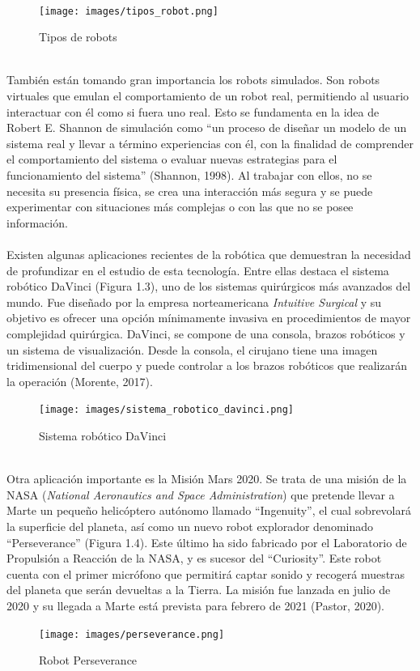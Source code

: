 \documentclass{report}
\begin{document}
\\
\begin{figure}
  \centering
    \texttt{[image: images/tipos\_robot.png]}
  \caption{Tipos de robots}
  \label{Tipos de robots}
\end{figure}
\\
También están tomando gran importancia los robots simulados. Son robots virtuales que emulan el comportamiento de un robot real, permitiendo al usuario interactuar con él como si fuera uno real. Esto se fundamenta en la idea de Robert E. Shannon de simulación como “un proceso de diseñar un modelo de un sistema real y llevar a término experiencias con él, con la finalidad de comprender el comportamiento del sistema o evaluar nuevas estrategias para el funcionamiento del sistema” (Shannon, 1998). Al trabajar con ellos, no se necesita su presencia física, se crea una interacción más segura y se puede experimentar con situaciones más complejas o con las que no se posee información.
\\
\\
Existen algunas aplicaciones recientes de la robótica que demuestran la necesidad de profundizar en el estudio de esta tecnología. Entre ellas destaca el sistema robótico DaVinci (Figura 1.3), uno de los sistemas quirúrgicos más avanzados del mundo. Fue diseñado por la empresa norteamericana \textit{Intuitive Surgical} y su objetivo es ofrecer una opción mínimamente invasiva en procedimientos de mayor complejidad quirúrgica. DaVinci, se compone de una consola, brazos robóticos y un sistema de visualización. Desde la consola, el cirujano tiene una imagen tridimensional del cuerpo y puede controlar a los brazos robóticos que realizarán la operación (Morente, 2017).
\\
\begin{figure} [h!]
  \centering
    \texttt{[image: images/sistema\_robotico\_davinci.png]}
  \caption{Sistema robótico DaVinci}
  \label{Sistema robótico DaVinci}
\end{figure}
\\
Otra aplicación importante es la Misión Mars 2020. Se trata de una misión de la NASA (\textit{National Aeronautics and Space Administration}) que pretende llevar a Marte un pequeño helicóptero autónomo llamado “Ingenuity”, el cual sobrevolará la superficie del planeta, así como un nuevo robot explorador  denominado “Perseverance” (Figura 1.4). Este último ha sido fabricado por el Laboratorio de Propulsión a Reacción de la NASA, y es sucesor del “Curiosity”. Este robot cuenta con el primer micrófono que permitirá captar sonido y recogerá muestras del planeta que serán devueltas a la Tierra. La misión fue lanzada en julio de 2020 y su llegada a Marte está prevista para febrero de 2021 (Pastor, 2020).
\\
\begin{figure} [h!]
  \centering
    \texttt{[image: images/perseverance.png]}
  \caption{Robot Perseverance}
  \label{Robot Perseverance}
\end{figure}
\end{document}
